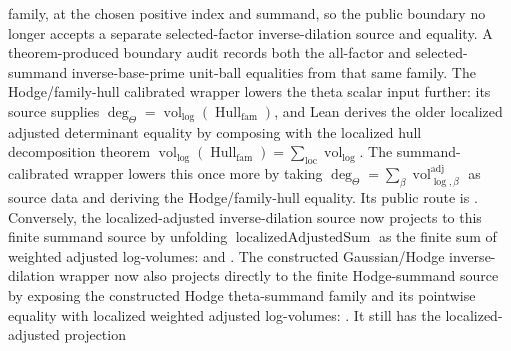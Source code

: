 \begin{proposition}
  family, at the chosen positive index and summand, so the public boundary no
  longer accepts a separate selected-factor inverse-dilation source and
  equality.  A theorem-produced boundary audit records both the all-factor and
  selected-summand inverse-base-prime unit-ball equalities from that same
  family.  The Hodge/family-hull calibrated wrapper lowers the theta scalar
  input further: its source supplies
  \(\deg_{\Theta}=\operatorname{vol}_{\log}(\operatorname{Hull}_{\mathrm{fam}})\),
  and Lean derives the older localized adjusted determinant equality by
  composing with the localized hull decomposition theorem
	  \(\operatorname{vol}_{\log}(\operatorname{Hull}_{\mathrm{fam}})
	  =\sum_{\mathrm{loc}}\operatorname{vol}_{\log}\).  The summand-calibrated
	  wrapper
	  lowers this once more by taking
	  \(\deg_{\Theta}=\sum_\beta\operatorname{vol}_{\log,\beta}^{\mathrm{adj}}\)
	  as source data and deriving the Hodge/family-hull equality.  Its public
	  route is
	  .
	  Conversely, the localized-adjusted inverse-dilation source now projects
	  to this finite summand source by unfolding
	  \(\operatorname{localizedAdjustedSum}\) as the finite sum of weighted
	  adjusted log-volumes:
	  and
	  .
	  The constructed Gaussian/Hodge inverse-dilation wrapper now also projects
	  directly to the finite Hodge-summand source by exposing the constructed
	  Hodge theta-summand family and its pointwise equality with localized
	  weighted adjusted log-volumes:
	  .
	  It still has the localized-adjusted projection

\end{proposition}
